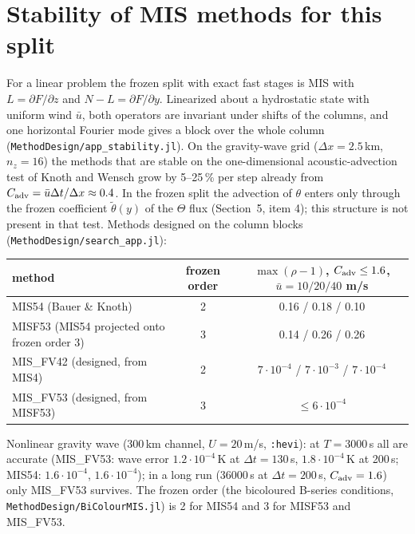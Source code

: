 \documentclass[11pt,a4paper]{article}
\newcommand{\dt}{\Delta t}
\newcommand{\code}[1]{\texttt{#1}}
\begin{document}
\section{Stability of MIS methods for this split}\label{sec:mis}
For a linear problem the frozen split with exact fast stages is MIS with $L=\partial F/\partial z$ and
$N-L=\partial F/\partial y$. Linearized about a hydrostatic state with uniform wind $\bar u$, both operators are
invariant under shifts of the columns, and one horizontal Fourier mode gives a block over the whole column
(\code{MethodDesign/app\_stability.jl}). On the gravity-wave grid ($\Delta x=2.5$\,km, $n_z=16$) the methods
that are stable on the one-dimensional acoustic-advection test of Knoth and Wensch grow by 5--25\,\% per step
already from $C_{\rm adv}=\bar u\dt/\Delta x\approx0.4$. In the frozen split the advection of $\theta$ enters only through the frozen coefficient $\tilde\theta(y)$ of the $\Theta$ flux (Section~5, item 4); this structure is not present in that test.
Methods designed on the column blocks (\code{MethodDesign/search\_app.jl}):
\begin{center}\footnotesize
\begin{tabular}{lcc}
\toprule
method & frozen order & $\max(\rho-1)$, $C_{\rm adv}\le1.6$, $\bar u=10/20/40$ m/s\\
\midrule
MIS54 (Bauer \& Knoth) & 2 & 0.16 / 0.18 / 0.10\\
MISF53 (MIS54 projected onto frozen order 3) & 3 & 0.14 / 0.26 / 0.26\\
MIS\_FV42 (designed, from MIS4) & 2 & $7\cdot10^{-4}$ / $7\cdot10^{-3}$ / $7\cdot10^{-4}$\\
MIS\_FV53 (designed, from MISF53) & 3 & $\le6\cdot10^{-4}$\\
\bottomrule
\end{tabular}
\end{center}
Nonlinear gravity wave (300\,km channel, $U=20$\,m/s, \code{:hevi}): at $T=3000$\,s all are accurate
(MIS\_FV53: wave error $1.2\cdot10^{-4}$\,K at $\dt=130$\,s, $1.8\cdot10^{-4}$\,K at 200\,s; MIS54: $1.6\cdot10^{-4}$,
$1.6\cdot10^{-4}$); in a long run (36000\,s at $\dt=200$\,s, $C_{\rm adv}=1.6$) only MIS\_FV53 survives. The
frozen order (the bicoloured B-series conditions, \code{MethodDesign/BiColourMIS.jl}) is 2 for MIS54 and 3
for MISF53 and MIS\_FV53.
\end{document}
